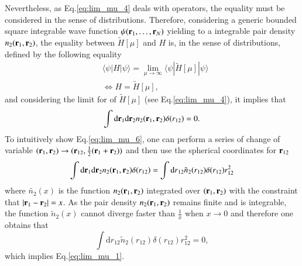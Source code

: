 \documentclass[aip,jcp,reprint,noshowkeys,superscriptaddress]{revtex4-1}
\newcommand{\matelem}[3]{\langle #1 | #2 | #3 \rangle}
\newcommand{\br}[0]{{\bf {r}}}
\begin{document}
Nevertheless, as Eq.\eqref{eq:lim_mu_4} deals with operators, the equality must be considered in the sense of distributions.  
Therefore, considering a generic bounded square integrable wave function $\psi(\br{}_1,\hdots,\br{}_N)$ yielding to a integrable pair density $n_2(\br{}_1,\br{}_2)$, the equality between $\tilde{H}[\mu]$ and $H$ is, in the sense of distributions, defined by the following equality 
\begin{equation}
 \label{eq:lim_mu_5}
 \begin{aligned}
& \matelem{\psi}{H}{\psi} = \lim_{\mu \rightarrow \infty} \matelem{\psi}{\tilde{H}[\mu]}{\psi} \\
& \Leftrightarrow H = \tilde{H}[\mu],
 \end{aligned}
\end{equation}
and considering the limit for of $\tilde{H}[\mu]$ (see Eq.\eqref{eq:lim_mu_4}), it implies that 
\begin{equation}
 \label{eq:lim_mu_6}
 \int \text{d}\br{}_1 \text{d}\br{}_2 n_2(\br{}_1,\br{}_2) \delta(r_{12}) = 0.
\end{equation}
To intuitively show Eq.\eqref{eq:lim_mu_6}, one can perform a series of change of variable $(\br{}_1,\br{}_2)\rightarrow (\br{}_{12},\frac{1}{2}(\br{}_1 + \br{}_2))$ and then use the spherical coordinates for $\br{}_{12}$ 
\begin{equation}
 \int \text{d}\br{}_1 \text{d}\br{}_2 n_2(\br{}_1,\br{}_2) \delta(r_{12}) = \int \text{d}r{}_{12}  \tilde{n}_2(r_{12}) \delta(r_{12}) r_{12}^2 
\end{equation}
where $\tilde{n_2}(x)$ is the function $n_2(\br{}_1,\br{}_2)$ integrated over $(\br{}_1,\br{}_2)$ with the constraint that 
$|\br{}_1-\br{}_2| = x$. 
As the pair density $n_2(\br{}_1,\br{}_2)$ remains finite and is integrable, the function $\tilde{n}_2(x)$ 
cannot diverge faster than $\frac{1}{x}$ when $x\rightarrow 0$ and therefore one obtains that 
\begin{equation}
 \int \text{d}r{}_{12}  \tilde{n}_2(r_{12}) \delta(r_{12}) r_{12}^2 = 0,
\end{equation}
which implies Eq.\eqref{eq:lim_mu_1}. 
\end{document}
